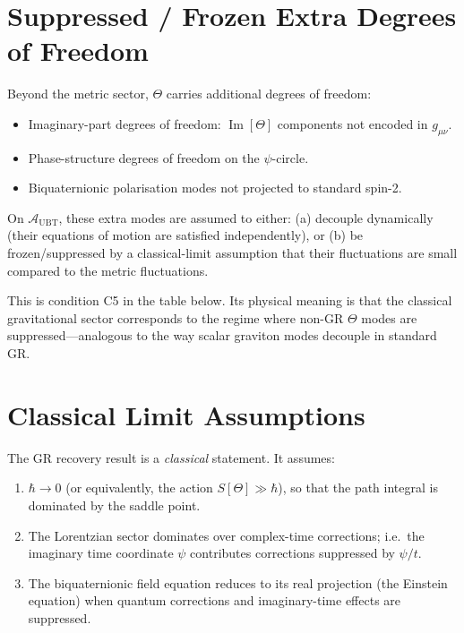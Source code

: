 \documentclass[12pt]{article}
\theoremstyle{definition}
\theoremstyle{remark}
\begin{document}
\section{Suppressed / Frozen Extra Degrees of Freedom}
\label{sec:extra_dofs}

Beyond the metric sector, $\Theta$ carries additional degrees of freedom:
\begin{itemize}
  \item Imaginary-part degrees of freedom: $\operatorname{Im}[\Theta]$ components
    not encoded in $g_{\mu\nu}$.
  \item Phase-structure degrees of freedom on the $\psi$-circle.
  \item Biquaternionic polarisation modes not projected to standard spin-2.
\end{itemize}

On $\mathcal{A}_{\mathrm{UBT}}$, these extra modes are assumed to either:
(a) decouple dynamically (their equations of motion are satisfied independently), or
(b) be frozen/suppressed by a classical-limit assumption that their fluctuations
are small compared to the metric fluctuations.

This is condition C5 in the table below.  Its physical meaning is that the
classical gravitational sector corresponds to the regime where non-GR $\Theta$
modes are suppressed—analogous to the way scalar graviton modes decouple in
standard GR.

\section{Classical Limit Assumptions}
\label{sec:classical_limit}

The GR recovery result is a \emph{classical} statement.  It assumes:
\begin{enumerate}
  \item $\hbar \to 0$ (or equivalently, the action $S[\Theta] \gg \hbar$),
    so that the path integral is dominated by the saddle point.
  \item The Lorentzian sector dominates over complex-time corrections;
    i.e.\ the imaginary time coordinate $\psi$ contributes corrections
    suppressed by $\psi/t$.
  \item The biquaternionic field equation reduces to its real projection
    (the Einstein equation) when quantum corrections and imaginary-time
    effects are suppressed.
\end{enumerate}
\end{document}

